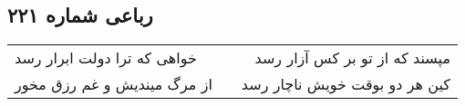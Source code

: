 \begin{center}
\section*{رباعی شماره ۲۲۱}
\label{sec:sh221}
\begin{longtable}{l p{0.5cm} r}
خواهی که ترا دولت ابرار رسد
&&
مپسند که از تو بر کس آزار رسد
\\
از مرگ میندیش و غم رزق مخور
&&
کین هر دو بوقت خویش ناچار رسد
\\
\end{longtable}
\end{center}
